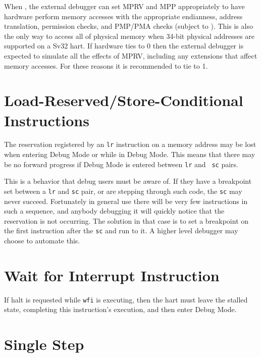 \begin{commentary}
    When , the external debugger can set MPRV and MPP appropriately to
    have hardware perform memory accesses with the appropriate endianness, address
    translation, permission checks, and PMP/PMA checks (subject to \FdmAbstractcsRelaxedpriv).
    This is also the only way to access all of physical memory when 34-bit physical
    addresses are supported on a Sv32 hart. If hardware ties \FcsrDcsrMprven to 0 then the
    external debugger is expected to simulate all the effects of MPRV, including
    any extensions that affect memory accesses.
    For these reasons it is recommended to tie \FcsrDcsrMprven to 1.
\end{commentary}

\section{Load-Reserved/Store-Conditional Instructions}

The reservation registered by an {\tt lr} instruction on a memory address may
be lost when entering Debug Mode or while in Debug Mode.  This means that there
may be no forward progress if Debug Mode is entered between {\tt lr} and {\tt
sc} pairs.

\begin{commentary}
    This is a behavior that debug users must be aware of. If they have a
    breakpoint set between a {\tt lr} and {\tt sc} pair, or are stepping
    through such code, the {\tt sc} may never succeed.  Fortunately in general use
    there will be very few instructions in such a sequence, and anybody
    debugging it will quickly notice that the reservation is not occurring.
    The solution in that case is to set a breakpoint on the first instruction
    after the {\tt sc} and run to it. A higher level debugger may choose to
    automate this.
\end{commentary}

\section{Wait for Interrupt Instruction}

If halt is requested while {\tt wfi} is executing, then the hart must leave the
stalled state, completing this instruction's execution, and then enter Debug
Mode.

\section{Single Step}


